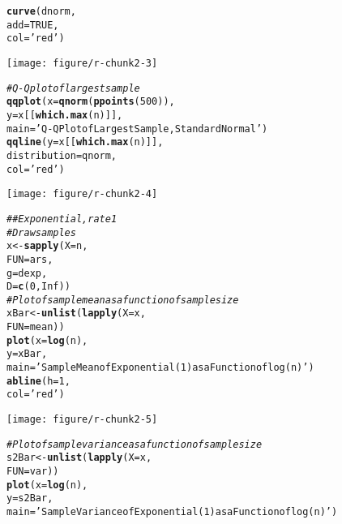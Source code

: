 \documentclass{article}\usepackage[]{graphicx}\usepackage[]{color}
\makeatletter
\def\maxwidth{ %
  \ifdim\Gin@nat@width>\linewidth
    \linewidth
  \else
    \Gin@nat@width
  \fi
}
\newcommand{\hlnum}[1]{\textcolor[rgb]{0.686,0.059,0.569}{#1}}%
\newcommand{\hlstr}[1]{\textcolor[rgb]{0.192,0.494,0.8}{#1}}%
\newcommand{\hlcom}[1]{\textcolor[rgb]{0.678,0.584,0.686}{\textit{#1}}}%
\newcommand{\hlstd}[1]{\textcolor[rgb]{0.345,0.345,0.345}{#1}}%
\newcommand{\hlkwb}[1]{\textcolor[rgb]{0.69,0.353,0.396}{#1}}%
\newcommand{\hlkwc}[1]{\textcolor[rgb]{0.333,0.667,0.333}{#1}}%
\newcommand{\hlkwd}[1]{\textcolor[rgb]{0.737,0.353,0.396}{\textbf{#1}}}%
\newenvironment{kframe}{%
 \def\at@end@of@kframe{}%
 \ifinner\ifhmode%
  \def\at@end@of@kframe{\end{minipage}}%
  \begin{minipage}{\columnwidth}%
 \fi\fi%
 \def\FrameCommand##1{\hskip\@totalleftmargin \hskip-\fboxsep
 \colorbox{shadecolor}{##1}\hskip-\fboxsep
     \hskip-\linewidth \hskip-\@totalleftmargin \hskip\columnwidth}%
 \MakeFramed {\advance\hsize-\width
   \@totalleftmargin\z@ \linewidth\hsize
   \@setminipage}}%
 {\par\unskip\endMakeFramed%
 \at@end@of@kframe}
\newenvironment{knitrout}{}{} %
\makeatother
\begin{document}
\begin{knitrout}
\begin{kframe}
\begin{alltt}
  \hlkwd{curve}\hlstd{(dnorm,}
        \hlkwc{add} \hlstd{=} \hlnum{TRUE}\hlstd{,}
        \hlkwc{col} \hlstd{=} \hlstr{'red'}\hlstd{)}
\end{alltt}
\end{kframe}
\texttt{[image: figure/r-chunk2-3]} 
\begin{kframe}\begin{alltt}
  \hlcom{# Q-Q plot of largest sample}
  \hlkwd{qqplot}\hlstd{(}\hlkwc{x} \hlstd{=} \hlkwd{qnorm}\hlstd{(}\hlkwd{ppoints}\hlstd{(}\hlnum{500}\hlstd{)),}
         \hlkwc{y} \hlstd{= x[[}\hlkwd{which.max}\hlstd{(n)]],}
         \hlkwc{main} \hlstd{=} \hlstr{'Q-Q Plot of Largest Sample, Standard Normal'}\hlstd{)}
  \hlkwd{qqline}\hlstd{(}\hlkwc{y} \hlstd{= x[[}\hlkwd{which.max}\hlstd{(n)]],}
         \hlkwc{distribution} \hlstd{= qnorm,}
         \hlkwc{col} \hlstd{=} \hlstr{'red'}\hlstd{)}
\end{alltt}
\end{kframe}
\texttt{[image: figure/r-chunk2-4]} 
\begin{kframe}\begin{alltt}
  \hlcom{## Exponential, rate 1}
  \hlcom{# Draw samples}
  \hlstd{x} \hlkwb{<-} \hlkwd{sapply}\hlstd{(}\hlkwc{X} \hlstd{= n,}
              \hlkwc{FUN} \hlstd{= ars,}
              \hlkwc{g} \hlstd{= dexp,}
              \hlkwc{D} \hlstd{=} \hlkwd{c}\hlstd{(}\hlnum{0}\hlstd{,}\hlnum{Inf}\hlstd{))}
  \hlcom{# Plot of sample mean as a function of sample size}
  \hlstd{xBar} \hlkwb{<-} \hlkwd{unlist}\hlstd{(}\hlkwd{lapply}\hlstd{(}\hlkwc{X} \hlstd{= x,}
                        \hlkwc{FUN} \hlstd{= mean))}
  \hlkwd{plot}\hlstd{(}\hlkwc{x} \hlstd{=} \hlkwd{log}\hlstd{(n),}
       \hlkwc{y} \hlstd{= xBar,}
       \hlkwc{main} \hlstd{=} \hlstr{'Sample Mean of Exponential (1) as a Function of log(n)'}\hlstd{)}
  \hlkwd{abline}\hlstd{(}\hlkwc{h} \hlstd{=} \hlnum{1}\hlstd{,}
         \hlkwc{col} \hlstd{=} \hlstr{'red'}\hlstd{)}
\end{alltt}
\end{kframe}
\texttt{[image: figure/r-chunk2-5]} 
\begin{kframe}\begin{alltt}
  \hlcom{# Plot of sample variance as a function of sample size}
  \hlstd{s2Bar} \hlkwb{<-} \hlkwd{unlist}\hlstd{(}\hlkwd{lapply}\hlstd{(}\hlkwc{X} \hlstd{= x,}
                         \hlkwc{FUN} \hlstd{= var))}
  \hlkwd{plot}\hlstd{(}\hlkwc{x} \hlstd{=} \hlkwd{log}\hlstd{(n),}
       \hlkwc{y} \hlstd{= s2Bar,}
       \hlkwc{main} \hlstd{=} \hlstr{'Sample Variance of Exponential (1) as a Function of log(n)'}\hlstd{)}

\end{alltt}
\end{kframe}
\end{knitrout}
\end{document}
